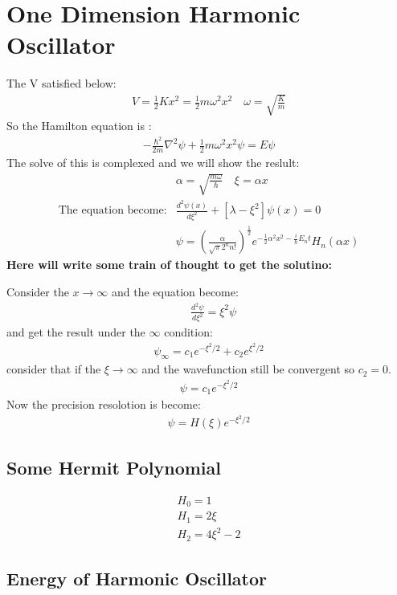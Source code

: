 \documentclass{article}
\begin{document}
\section{One Dimension Harmonic Oscillator}
The V satisfied below:
\begin{align}
  V=\frac12Kx^2=\frac12m\omega^2x^2\quad \omega=\sqrt{\frac{K}{m}}
\end{align}
So the Hamilton equation is :
\begin{align}
  -\frac{\hbar^2}{2m}\nabla^2\psi+\frac12m\omega^2x^2\psi=E\psi
\end{align}
The solve of this is complexed and we will show the reslult:
\begin{align}
  &\alpha=\sqrt{\frac{m\omega}{\hbar}}\quad \xi=\alpha x\\
  \text{The equation become:}&\frac{d^2\psi(x)}{d\xi^2}+[\lambda-\xi^2]\psi(x)=0 \\
  &\psi=(\frac{\alpha}{\sqrt{\pi}2^nn!})^{\frac12}e^{-\frac12\alpha^2x^2-\frac{i}{\hbar}E_nt}H_n(\alpha x)
\end{align}
\textbf{Here will write some train of thought to get the solutino:}

Consider the $x\rightarrow \infty$ and the equation become:
\begin{align}
&\frac{d^2\psi}{d\xi^2}=\xi^2\psi
\end{align}
and get the result under the $ \infty$ condition:
\begin{align}
  \psi_{\infty}=c_1e^{-\xi^2/2}+c_2e^{\xi^2/2}
\end{align}
consider that if the $\xi\rightarrow \infty$ and the wavefunction still be convergent so $c_2=0$.
\begin{align}
  \psi=c_1e^{-\xi^2/2}
\end{align}
Now the precision resolotion is become:
\begin{align}
  \psi=H(\xi)e^{-\xi^2/2}
\end{align}
\subsection{Some Hermit Polynomial}
\begin{align}
H_0=1\\
H_1=2\xi\\
H_2=4\xi^2-2
\end{align}
\subsection{Energy of Harmonic Oscillator}
\end{document}
